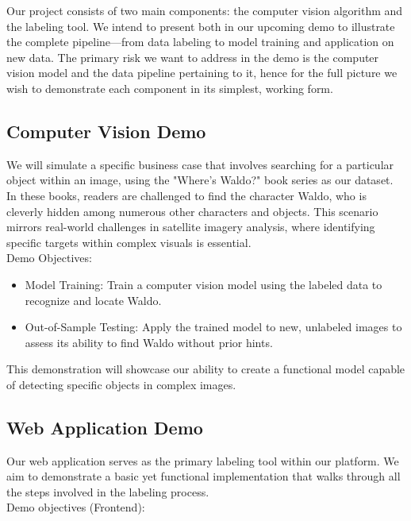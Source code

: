 \documentclass{article}
\begin{document}
Our project consists of two main components: the computer vision algorithm and the labeling tool. We intend to present both in our upcoming demo to illustrate the complete pipeline—from data labeling to model training and application on new data. The primary risk we want to address in the demo is the computer vision model and the data pipeline pertaining to it, hence for the full picture we wish to demonstrate each component in its simplest, working form. \\

\subsection{Computer Vision Demo}

We will simulate a specific business case that involves searching for a particular object within an image, using the "Where's Waldo?" book series as our dataset. In these books, readers are challenged to find the character Waldo, who is cleverly hidden among numerous other characters and objects. This scenario mirrors real-world challenges in satellite imagery analysis, where identifying specific targets within complex visuals is essential.\\

Demo Objectives:

\begin{itemize}
    \item Model Training: Train a computer vision model using the labeled data to recognize and locate Waldo.
    \item Out-of-Sample Testing: Apply the trained model to new, unlabeled images to assess its ability to find Waldo without prior hints.
\end{itemize}

This demonstration will showcase our ability to create a functional model capable of detecting specific objects in complex images.\\

\subsection{Web Application Demo}

Our web application serves as the primary labeling tool within our platform. We aim to demonstrate a basic yet functional implementation that walks through all the steps involved in the labeling process.\\

Demo objectives (Frontend):
\end{document}
